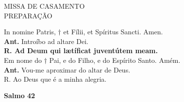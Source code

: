 \begin{center}
	MISSA DE CASAMENTO
	\\PREPARAÇÃO
\end{center}


\begin{multicols}{2}
\noindent
In nomine Patris, $\dag$  et Fílii, et Spíritus Sancti. Amen.
\\ \textbf{Ant.} Introíbo ad altare Dei.
\\ \textbf{R. Ad Deum qui lætíficat juventútem meam.}
\\ Em nome do $\dag$ Pai, e do Filho, e do Espírito Santo. Amém.
\\ \textbf{Ant.} Vou-me aproximar do altar de Deus.
\\ R. Ao Deus que é a minha alegria.
\end{multicols}
\begin{center}
	\textbf{Salmo 42}
\end{center}
